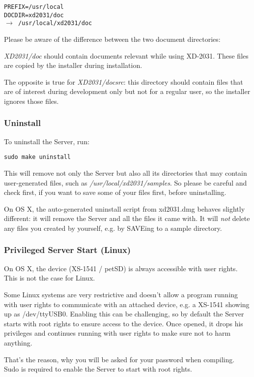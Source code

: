 \texttt{PREFIX=/usr/local \\
DOCDIR=xd2031/doc \\
$\to$ /usr/local/xd2031/doc}

Please be aware of the difference between the two document directories:

\textit{XD2031/doc} should contain documents relevant while
using XD-2031. These files are copied by the installer during installation.

The opposite is true for \textit{XD2031/docsrc}: this directory should
contain files that are of interest during development only but not
for a regular user, so the installer ignores those files.

\subsubsection{Uninstall}
To uninstall the Server, run:

\begin{verbatim}
sudo make uninstall
\end{verbatim}

This will remove not only the Server but also all its directories that may
contain user-generated files, such as \textit{/usr/local/xd2031/samples}.
So please be careful and check first, if you want to save some of your
files first, before uninstalling.

On OS X, the auto-generated uninstall script from xd2031.dmg behaves
slightly different: it will remove the Server and all the files it came with. 
It will \textit{not} delete any files you created by yourself, e.g. by
SAVEing to a sample directory.

\subsubsection{Privileged Server Start (Linux)}
\label{rights}
On OS X, the device (XS-1541 / petSD) is always accessible with
user rights. This is not the case for Linux.

Some Linux systems are very restrictive and doesn't allow a program running
with user rights to communicate with an attached device, e.g. a XS-1541
showing up as /dev/ttyUSB0. Enabling this can be challenging, so by default
the Server starts with root rights to ensure access to the device.
Once opened, it drops his privileges and continues running with user rights
to make sure not to harm anything.

That's the reason, why you will be asked for your password when compiling.
Sudo is required to enable the Server to start with root rights.

